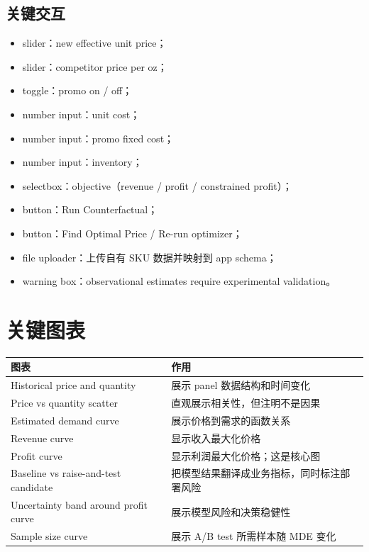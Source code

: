 \documentclass[UTF8,11pt,a4paper,fontset=none]{ctexart}
\begin{document}
\subsection{关键交互}

\begin{itemize}
  \item slider：new effective unit price；
  \item slider：competitor price per oz；
  \item toggle：promo on / off；
  \item number input：unit cost；
  \item number input：promo fixed cost；
  \item number input：inventory；
  \item selectbox：objective（revenue / profit / constrained profit）；
  \item button：Run Counterfactual；
  \item button：Find Optimal Price / Re-run optimizer；
  \item file uploader：上传自有 SKU 数据并映射到 app schema；
  \item warning box：observational estimates require experimental validation。
\end{itemize}

\section{关键图表}

\begin{tabularx}{\textwidth}{L{4.0cm}Y}
\toprule
图表 & 作用 \\
\midrule
Historical price and quantity & 展示 panel 数据结构和时间变化 \\
Price vs quantity scatter & 直观展示相关性，但注明不是因果 \\
Estimated demand curve & 展示价格到需求的函数关系 \\
Revenue curve & 显示收入最大化价格 \\
Profit curve & 显示利润最大化价格；这是核心图 \\
Baseline vs raise-and-test candidate & 把模型结果翻译成业务指标，同时标注部署风险 \\
Uncertainty band around profit curve & 展示模型风险和决策稳健性 \\
Sample size curve & 展示 A/B test 所需样本随 MDE 变化 \\
\bottomrule
\end{tabularx}
\end{document}
